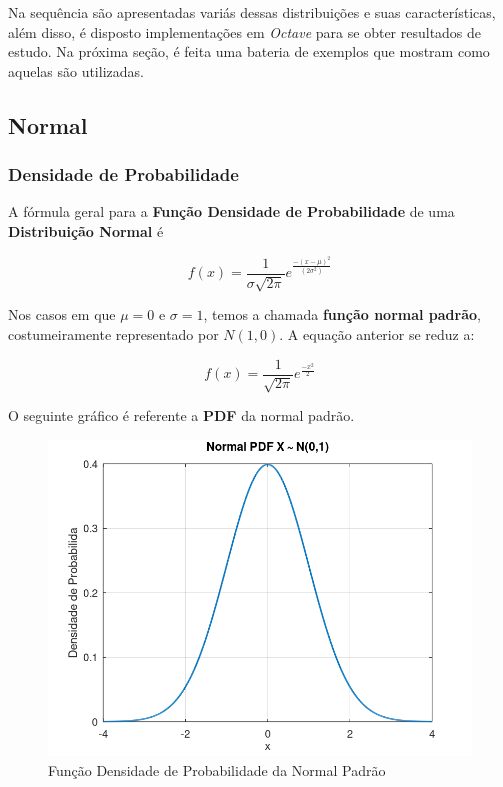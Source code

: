 \documentclass[
]{book}
\begin{document}
Na sequência são apresentadas variás dessas distribuições e suas características, além disso, é disposto implementações em \emph{Octave} para se obter resultados de estudo. Na próxima seção, é feita uma bateria de exemplos que mostram como aquelas são utilizadas.

\hypertarget{normal}{%
\subsection{Normal}\label{normal}}

\hypertarget{densidade-de-probabilidade}{%
\subsubsection*{Densidade de Probabilidade}\label{densidade-de-probabilidade}}

A fórmula geral para a \textbf{Função Densidade de Probabilidade} de uma \textbf{Distribuição Normal} é

\begin{equation}
  f(x) =  \frac{1}{\sigma \sqrt{2 \pi}} e^{\frac{-(x-\mu)^2}{(2\sigma^2)}}
\end{equation}

Nos casos em que \(\mu = 0\) e \(\sigma = 1\), temos a chamada \textbf{função normal padrão}, costumeiramente representado por \(N(1,0)\). A equação anterior se reduz a:

\begin{equation}
  f(x) = \frac{1}{\sqrt{2 \pi}} e^{\frac{-x^2}{2}}
\end{equation}

O seguinte gráfico é referente a \textbf{PDF} da normal padrão.

\begin{figure}

{\centering \includegraphics[width=0.5\linewidth]{images/normalpdf} 

}

\caption{Função Densidade de Probabilidade da Normal Padrão}\label{fig:unnamed-chunk-1}
\end{figure}
\end{document}
